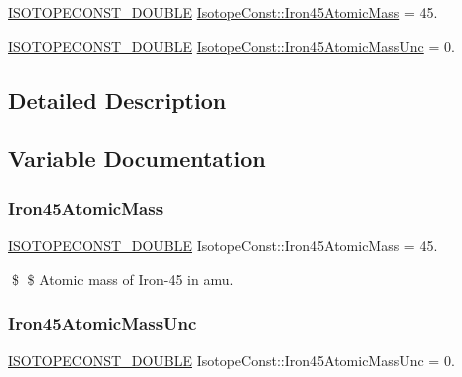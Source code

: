 \begin{DoxyCompactItemize}
\item 
\mbox{\hyperlink{group___isotope_const-_macros_ga8f45a7272ce02c0b4c65c44636ed719a}{I\+S\+O\+T\+O\+P\+E\+C\+O\+N\+S\+T\+\_\+\+D\+O\+U\+B\+LE}} \mbox{\hyperlink{group___isotope_const-_iron-_fe45_gad4b1ba043a74a3c78ba76895707874fe}{Isotope\+Const\+::\+Iron45\+Atomic\+Mass}} = 45.
\item 
\mbox{\hyperlink{group___isotope_const-_macros_ga8f45a7272ce02c0b4c65c44636ed719a}{I\+S\+O\+T\+O\+P\+E\+C\+O\+N\+S\+T\+\_\+\+D\+O\+U\+B\+LE}} \mbox{\hyperlink{group___isotope_const-_iron-_fe45_gabd710ad5a16d67006347c11d3a0a9857}{Isotope\+Const\+::\+Iron45\+Atomic\+Mass\+Unc}} = 0.
\end{DoxyCompactItemize}


\subsection{Detailed Description}


\subsection{Variable Documentation}
\mbox{\label{group___isotope_const-_iron-_fe45_gad4b1ba043a74a3c78ba76895707874fe}} 
\subsubsection{\texorpdfstring{Iron45\+Atomic\+Mass}{Iron45AtomicMass}}
{\footnotesize\ttfamily \mbox{\hyperlink{group___isotope_const-_macros_ga8f45a7272ce02c0b4c65c44636ed719a}{I\+S\+O\+T\+O\+P\+E\+C\+O\+N\+S\+T\+\_\+\+D\+O\+U\+B\+LE}} Isotope\+Const\+::\+Iron45\+Atomic\+Mass = 45.}

\$ \$ Atomic mass of Iron-\/45 in amu. \mbox{\label{group___isotope_const-_iron-_fe45_gabd710ad5a16d67006347c11d3a0a9857}} 
\subsubsection{\texorpdfstring{Iron45\+Atomic\+Mass\+Unc}{Iron45AtomicMassUnc}}
{\footnotesize\ttfamily \mbox{\hyperlink{group___isotope_const-_macros_ga8f45a7272ce02c0b4c65c44636ed719a}{I\+S\+O\+T\+O\+P\+E\+C\+O\+N\+S\+T\+\_\+\+D\+O\+U\+B\+LE}} Isotope\+Const\+::\+Iron45\+Atomic\+Mass\+Unc = 0.}

